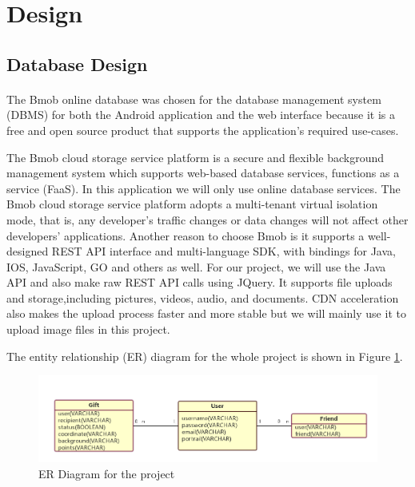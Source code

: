 \section{Design}
\label{sec:Design}

\subsection{Database Design} 
\paragraph{}The Bmob online database was chosen for the database management system (DBMS) for both the Android application and the web interface because it is a free and open source product that supports the application's required use-cases. 
\par The Bmob cloud storage service platform is a secure and flexible background management system which supports web-based database services, functions as a service (FaaS). In this application we will only use online database services. The Bmob cloud storage service platform adopts a multi-tenant virtual isolation mode, that is, any developer's traffic changes or data changes will not affect other developers' applications. 
Another reason to choose Bmob is it supports a well-designed REST API interface and multi-language SDK, with bindings for Java, IOS, JavaScript, GO and others as well. For our project, we will use the Java API and also make raw REST API calls using JQuery. It supports file uploads and storage,including pictures, videos, audio, and documents. CDN acceleration also makes the upload process faster and more stable but we will mainly use it to upload image files in this project. 
\par The entity relationship (ER) diagram for the whole project is shown in Figure \ref{ERDiagram}.

\begin{figure}[htb]
\centering
\includegraphics[width=1\textwidth]{section03/assets/ERDiagram.png}
\caption[ER Diagram for the project]{\label{ERDiagram}ER Diagram for the project}
\end{figure}


